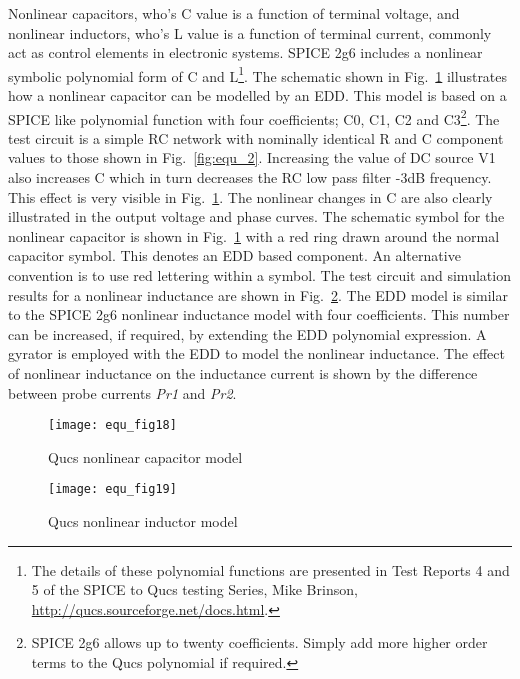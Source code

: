 Nonlinear capacitors, who's C value is a function of terminal voltage,
and nonlinear inductors, who's L value is a function of terminal
current, commonly act as control elements in electronic systems. SPICE
2g6 includes a nonlinear symbolic polynomial form of C and
L\footnote{The details of these polynomial functions are presented in
Test Reports 4 and 5 of the SPICE to Qucs testing Series, Mike
Brinson, \url{http://qucs.sourceforge.net/docs.html}.}. The schematic
shown in Fig.~\ref{fig:equ_18} illustrates how a nonlinear capacitor
can be modelled by an EDD. This model is based on a SPICE like
polynomial function with four coefficients; C0, C1, C2 and
C3\footnote{SPICE 2g6 allows up to twenty coefficients. Simply add
more higher order terms to the Qucs polynomial if required.}. The test
circuit is a simple RC network with nominally identical R and C
component values to those shown in Fig.~\ref{fig:equ_2}. Increasing
the value of DC source V1 also increases C which in turn decreases the
RC low pass filter -3dB frequency. This effect is very visible in 
Fig.~\ref{fig:equ_18}. The nonlinear changes in C are also clearly
illustrated in the output voltage and phase curves. The schematic
symbol for the nonlinear capacitor is shown in Fig.~\ref{fig:equ_18}
with a red ring drawn around the normal capacitor symbol. This denotes
an EDD based component. An alternative convention is to use red
lettering within a symbol. The test circuit and simulation results for
a nonlinear inductance are shown in Fig.~\ref{fig:equ_19}. The EDD
model is similar to the SPICE 2g6 nonlinear inductance model with four 
coefficients. This number can be increased, if required, by extending
the EDD polynomial expression. A gyrator is employed with the EDD to
model the nonlinear inductance. The effect of nonlinear inductance on
the inductance current is shown by the difference between probe 
currents \textit{Pr1} and \textit{Pr2}.


 

\begin{figure}[h]   
  \centering
  \texttt{[image: equ\_fig18]}  
  \caption{Qucs nonlinear capacitor model} 
  \label{fig:equ_18} 
\end{figure} 

\begin{figure}[h] 
  \centering
  \texttt{[image: equ\_fig19]} 
  \caption{Qucs nonlinear inductor model} 
  \label{fig:equ_19}
\end{figure} 



